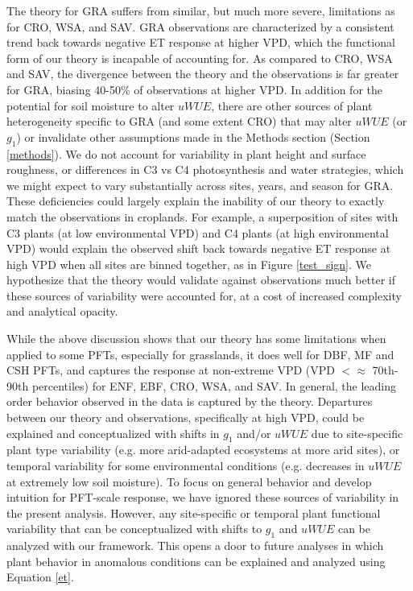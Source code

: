 The theory for GRA suffers from similar, but much more severe,
limitations as for CRO, WSA, and SAV. GRA observations are
characterized by a consistent trend back towards negative ET response
at higher VPD, which the functional form of our theory is incapable of
accounting for. As compared to CRO, WSA and SAV, the divergence
between the theory and the observations is far greater for GRA,
biasing 40-50\% of observations at higher VPD. In addition for the
potential for soil moisture to alter $uWUE$, there are other sources
of plant heterogeneity specific to GRA (and some extent CRO) that may
alter $uWUE$ (or $g_1$) or invalidate other assumptions made in the
Methods section (Section \ref{methods}). We do not account for
variability in plant height and surface roughness, or differences in
C3 vs C4 photosynthesis and water strategies, which we might expect to
vary substantially across sites, years, and season for GRA. These
deficiencies could largely explain the inability of our theory to
exactly match the observations in croplands. For example, a
superposition of sites with C3 plants (at low environmental VPD) and
C4 plants (at high environmental VPD) would explain the observed shift
back towards negative ET response at high VPD when all sites are
binned together, as in Figure \ref{test_sign}. We hypothesize that the
theory would validate against observations much better if these
sources of variability were accounted for, at a cost of increased
complexity and analytical opacity. 


While the above discussion shows that our theory has some limitations
when applied to some PFTs, especially for grasslands, it does well for
DBF, MF and CSH PFTs, and captures the response at non-extreme VPD
(VPD $< \approx$ 70th-90th percentiles) for
ENF, EBF, CRO, WSA, and SAV. In general, the leading order behavior
observed in the data is captured by the theory. Departures between our
theory and observations, specifically at high VPD, could be explained
and conceptualized with shifts in $g_1$ and/or $uWUE$ due to
site-specific plant type variability (e.g. more arid-adapted ecosystems
at more arid sites), or temporal variability for some environmental
conditions (e.g. decreases in $uWUE$ at extremely low soil
moisture). To focus on general behavior and develop intuition for
PFT-scale response, we have ignored these sources of variability in
the present analysis. However, any site-specific or temporal plant
functional variability that can be conceptualized with shifts to $g_1$
and $uWUE$ can be analyzed with our framework. This opens a door to future analyses in which plant behavior in anomalous conditions
can be explained and analyzed using Equation \ref{et}.

